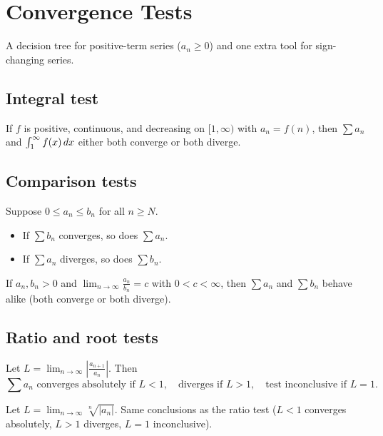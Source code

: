 \section{Convergence Tests}

A decision tree for positive-term series ($a_n \ge 0$) and one extra tool for sign-changing series.

\subsection{Integral test}
\begin{theorem}
If $f$ is positive, continuous, and decreasing on $[1,\infty)$ with $a_n = f(n)$, then
$\sum a_n$ and $\int_1^\infty f(x) \,dx$ either both converge or both diverge.
\end{theorem}

\subsection{Comparison tests}
\begin{theorem}
Suppose $0 \le a_n \le b_n$ for all $n \ge N$.
\begin{itemize}[leftmargin=*,nosep]
  \item If $\sum b_n$ converges, so does $\sum a_n$.
  \item If $\sum a_n$ diverges, so does $\sum b_n$.
\end{itemize}
\end{theorem}

\begin{theorem}
If $a_n, b_n > 0$ and $\displaystyle \lim_{n\to\infty} \frac{a_n}{b_n} = c$ with $0 < c < \infty$,
then $\sum a_n$ and $\sum b_n$ behave alike (both converge or both diverge).
\end{theorem}

\subsection{Ratio and root tests}
\begin{theorem}
Let $\displaystyle L = \lim_{n\to\infty} \left| \frac{a_{n+1}}{a_n} \right|$. Then
\[
\sum a_n \text{ converges absolutely if } L < 1, \quad
\text{diverges if } L > 1, \quad
\text{test inconclusive if } L = 1.
\]
\end{theorem}

\begin{theorem}
Let $\displaystyle L = \lim_{n\to\infty} \sqrt[n]{|a_n|}$. Same conclusions as the ratio test
($L<1$ converges absolutely, $L>1$ diverges, $L=1$ inconclusive).
\end{theorem}

